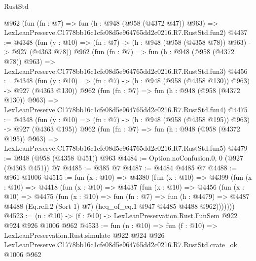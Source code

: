 \begin{lexlean}{RustStd}
\begin{coremodule}
    @962
    (fun (fn : @7) =>
    fun (h : @948 (@958 (@4372 @47)) @963) =>
    LexLeanPreserve.C1778bb16c1cfe08d5e964765dd2c0216.R7.RustStd.fun2)
@4437 := @4348
    (fun (y : @10) => (fn : @7) -> (h : @948 (@958 (@4358 @78)) @963) -> @927 (@4363 @78))
    @962
    (fun (fn : @7) =>
    fun (h : @948 (@958 (@4372 @78)) @963) =>
    LexLeanPreserve.C1778bb16c1cfe08d5e964765dd2c0216.R7.RustStd.fun3)
@4456 := @4348
    (fun (y : @10) => (fn : @7) -> (h : @948 (@958 (@4358 @130)) @963) -> @927 (@4363 @130))
    @962
    (fun (fn : @7) =>
    fun (h : @948 (@958 (@4372 @130)) @963) =>
    LexLeanPreserve.C1778bb16c1cfe08d5e964765dd2c0216.R7.RustStd.fun4)
@4475 := @4348
    (fun (y : @10) => (fn : @7) -> (h : @948 (@958 (@4358 @195)) @963) -> @927 (@4363 @195))
    @962
    (fun (fn : @7) =>
    fun (h : @948 (@958 (@4372 @195)) @963) =>
    LexLeanPreserve.C1778bb16c1cfe08d5e964765dd2c0216.R7.RustStd.fun5)
@4479 := @948 (@958 (@4358 @451)) @963
@4484 := Option.noConfusion.{0, 0} (@927 (@4363 @451)) @7
@4485 := @385 @7
@4487 := @4484 @4485 @7
@4488 := @961 @1006
@4515 := fun (x : @10) =>
  @4380
    (fun (x : @10) =>
    @4399
      (fun (x : @10) =>
      @4418
        (fun (x : @10) =>
        @4437
          (fun (x : @10) =>
          @4456
            (fun (x : @10) =>
            @4475
              (fun (x : @10) =>
              fun (fn : @7) =>
              fun (h : @4479) =>
              @4487 @4488 (Eq.refl.{2} (Sort 1) @7) (heq_of_eq.{1} @947 @4485 @4488 @962)))))))
@4523 := (n : @10) -> (f : @10) -> LexLeanPreservation.Rust.FunSem @922 @924 @926 @1006 @962
@4533 := fun (n : @10) =>
  fun (f : @10) =>
  LexLeanPreservation.Rust.simulate
    @922
    @924
    @926
    LexLeanPreserve.C1778bb16c1cfe08d5e964765dd2c0216.R7.RustStd.crate_ok
    @1006
    @962
\end{coremodule}
\end{lexlean}
